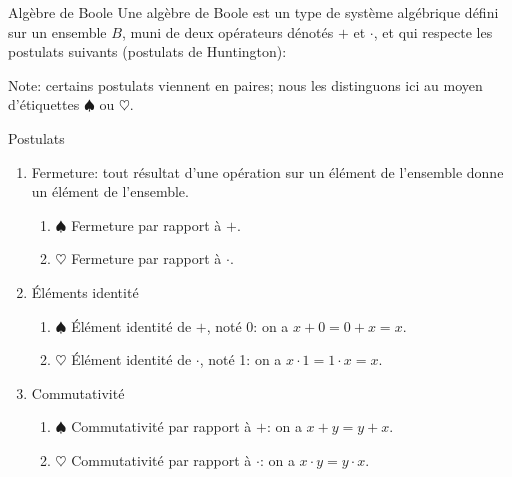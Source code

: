 \documentclass[presentation]{beamer}
\begin{document}
\begin{frame}[label={sec:orgd864595}]{Algèbre de Boole}
Une algèbre de Boole est un type de système algébrique défini sur un
ensemble \(B\), muni de deux opérateurs dénotés \(+\) et \(\cdot\), et qui
respecte les postulats suivants (postulats de Huntington):

Note: certains postulats viennent en paires; nous les distinguons ici au
moyen d'étiquettes \(\spadesuit\) ou \(\heartsuit\).
\end{frame}

\begin{frame}[label={sec:orgb57287d}]{Postulats}
\begin{enumerate}
\item Fermeture: tout résultat d'une opération sur un élément de
l'ensemble donne un élément de l'ensemble.

\begin{enumerate}
\item \(\spadesuit\) Fermeture par rapport à \(+\).

\item \(\heartsuit\) Fermeture par rapport à \(\cdot\).
\end{enumerate}

\item Éléments identité

\begin{enumerate}
\item \(\spadesuit\) Élément identité de \(+\), noté 0: on a \(x + 0 = 0 + x = x\).

\item \(\heartsuit\) Élément identité de \(\cdot\), noté 1: on a \(x \cdot 1 = 1 \cdot x = x\).
\end{enumerate}

\item Commutativité

\begin{enumerate}
\item \(\spadesuit\) Commutativité par rapport à \(+\): on a \(x + y = y + x\).

\item \(\heartsuit\) Commutativité par rapport à \(\cdot\): on a \(x \cdot y = y
        \cdot x\).
\end{enumerate}
\end{enumerate}
\end{frame}
\end{document}
